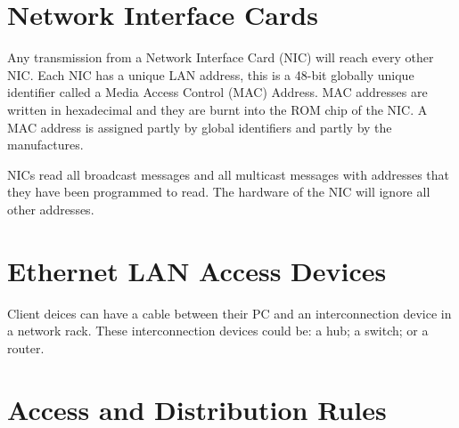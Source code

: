 
\section*{Network Interface Cards}
Any transmission from a Network Interface Card (NIC) will reach every other NIC. Each NIC has a unique LAN address, this is a 48-bit globally unique identifier called a Media Access Control (MAC) Address. MAC addresses are written in hexadecimal and they are burnt into the ROM chip of the NIC. A MAC address is assigned partly by global identifiers and partly by the manufactures. 

NICs read all broadcast messages and all multicast messages with addresses that they have been programmed to read. The hardware of the NIC will ignore all other addresses.

\section*{Ethernet LAN Access Devices}
Client deices can have a cable between their PC and an interconnection device in a network rack. These interconnection devices could be: a hub; a switch; or a router.

\section*{Access and Distribution Rules}
